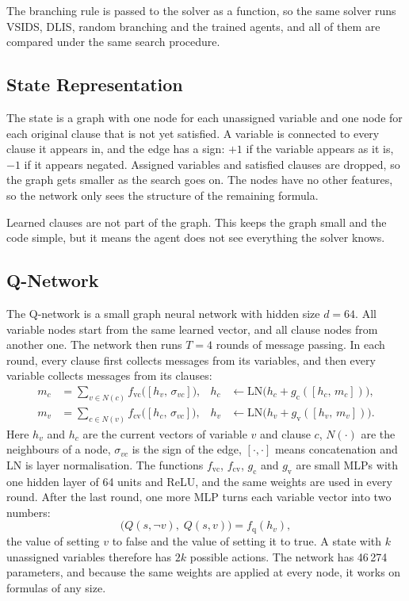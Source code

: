 \documentclass[11pt,a4paper]{article}
\begin{document}
The branching rule is passed to the solver as a function, so the same solver runs VSIDS, DLIS, random branching and the trained agents, and all of them are compared under the same search procedure.

\subsection{State Representation}

The state is a graph with one node for each unassigned variable and one node for each original clause that is not yet satisfied. A variable is connected to every clause it appears in, and the edge has a sign: $+1$ if the variable appears as it is, $-1$ if it appears negated. Assigned variables and satisfied clauses are dropped, so the graph gets smaller as the search goes on. The nodes have no other features, so the network only sees the structure of the remaining formula.

Learned clauses are not part of the graph. This keeps the graph small and the code simple, but it means the agent does not see everything the solver knows.

\subsection{Q-Network}

The Q-network is a small graph neural network with hidden size $d = 64$. All variable nodes start from the same learned vector, and all clause nodes from another one. The network then runs $T = 4$ rounds of message passing. In each round, every clause first collects messages from its variables, and then every variable collects messages from its clauses:
\begin{align}
    m_c &= \sum_{v \in N(c)} f_{\mathrm{vc}}\big([h_v,\, \sigma_{vc}]\big), &
    h_c &\leftarrow \mathrm{LN}\big(h_c + g_{\mathrm{c}}([h_c,\, m_c])\big), \label{eq:clause_update} \\
    m_v &= \sum_{c \in N(v)} f_{\mathrm{cv}}\big([h_c,\, \sigma_{vc}]\big), &
    h_v &\leftarrow \mathrm{LN}\big(h_v + g_{\mathrm{v}}([h_v,\, m_v])\big). \label{eq:var_update}
\end{align}
Here $h_v$ and $h_c$ are the current vectors of variable $v$ and clause $c$, $N(\cdot)$ are the neighbours of a node, $\sigma_{vc}$ is the sign of the edge, $[\cdot,\cdot]$ means concatenation and LN is layer normalisation. The functions $f_{\mathrm{vc}}$, $f_{\mathrm{cv}}$, $g_{\mathrm{c}}$ and $g_{\mathrm{v}}$ are small MLPs with one hidden layer of 64 units and ReLU, and the same weights are used in every round. After the last round, one more MLP turns each variable vector into two numbers:
\begin{equation}
    \big(Q(s, \neg v),\; Q(s, v)\big) = f_{\mathrm{q}}(h_v),
    \label{eq:q_head}
\end{equation}
the value of setting $v$ to false and the value of setting it to true. A state with $k$ unassigned variables therefore has $2k$ possible actions. The network has 46\,274 parameters, and because the same weights are applied at every node, it works on formulas of any size.
\end{document}
